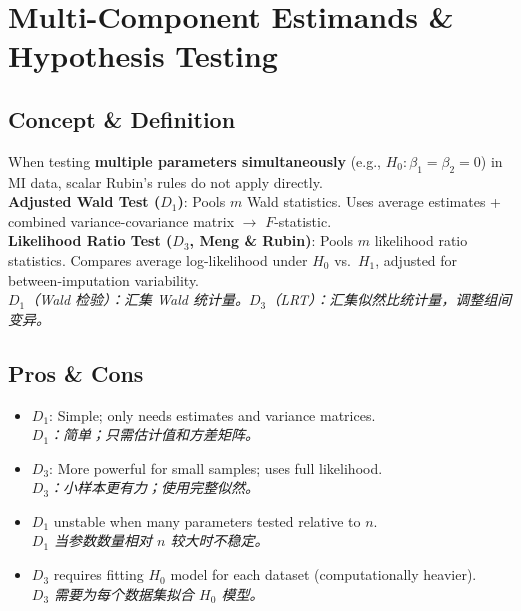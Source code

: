 \documentclass[9pt, a4paper]{article}
\begin{document}
\section{Multi-Component Estimands \& Hypothesis Testing}

\subsection{Concept \& Definition}
\begin{tcolorbox}[defbox]
    When testing \textbf{multiple parameters simultaneously} (e.g., $H_0: \beta_1 = \beta_2 = 0$) in MI data, scalar Rubin's rules do not apply directly.\\[3pt]
    \textbf{Adjusted Wald Test ($D_1$)}: Pools $m$ Wald statistics. Uses average estimates + combined variance-covariance matrix $\to$ $F$-statistic.\\[3pt]
    \textbf{Likelihood Ratio Test ($D_3$, Meng \& Rubin)}: Pools $m$ likelihood ratio statistics. Compares average log-likelihood under $H_0$ vs.\ $H_1$, adjusted for between-imputation variability.\\
    \textit{$D_1$（Wald 检验）：汇集 Wald 统计量。$D_3$（LRT）：汇集似然比统计量，调整组间变异。}
\end{tcolorbox}

\subsection{Pros \& Cons}
\begin{tcolorbox}[prosbox]
    \begin{itemize}
        \item [\ding{51}] $D_1$: Simple; only needs estimates and variance matrices.\\
        \textit{$D_1$：简单；只需估计值和方差矩阵。}
        \item [\ding{51}] $D_3$: More powerful for small samples; uses full likelihood.\\
        \textit{$D_3$：小样本更有力；使用完整似然。}
    \end{itemize}
\end{tcolorbox}
\begin{tcolorbox}[consbox]
    \begin{itemize}
        \item [\ding{55}] $D_1$ unstable when many parameters tested relative to $n$.\\
        \textit{$D_1$ 当参数数量相对 $n$ 较大时不稳定。}
        \item [\ding{55}] $D_3$ requires fitting $H_0$ model for each dataset (computationally heavier).\\
        \textit{$D_3$ 需要为每个数据集拟合 $H_0$ 模型。}
    \end{itemize}
\end{tcolorbox}
\end{document}
